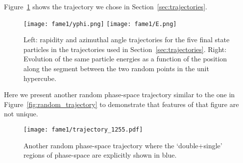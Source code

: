 \documentclass[main.tex]{subfiles}
\begin{document}
Figure~\ref{fig:detectorpath} shows the trajectory we chose in Section~\ref{sec:trajectories}.

\begin{figure}
    \centering
    \texttt{[image: fame1/yphi.png]}
    \texttt{[image: fame1/E.png]}
    \caption{Left: rapidity and azimuthal angle trajectories for the five final state particles in the trajectories used in Section~\ref{sec:trajectories}.
    Right: Evolution of the same particle energies as a function of the position along the segment between the two random points in the unit hypercube.
    }
    \label{fig:detectorpath}
\end{figure}

Here we present another random phase-space trajectory similar to the one
in Figure~\ref{fig:random_trajectory} to demonstrate that features of that
figure are not unique.
\begin{figure}
    \texttt{[image: fame1/trajectory\_1255.pdf]}
    \caption{Another random phase-space trajectory where the `double+single'
    regions of phase-space are explicitly shown in blue.}
    \label{fig:trajectory_1255}
\end{figure}
\end{document}
